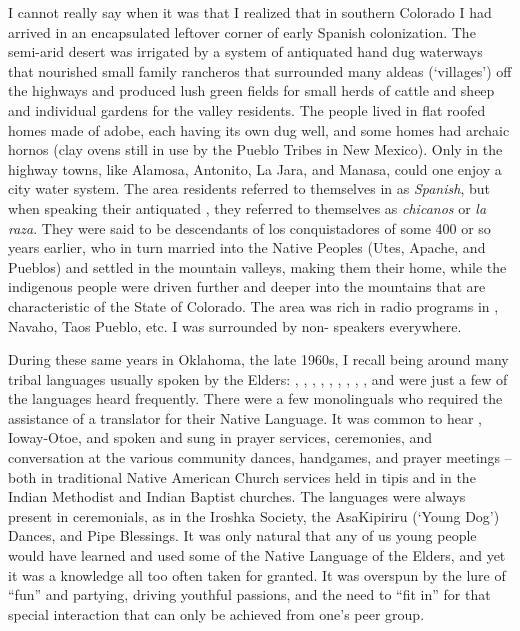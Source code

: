 \documentclass[output=paper]{LSP/langsci}
\begin{document}
I cannot really say when it was that I realized that in southern Colorado I had arrived in an encapsulated leftover corner of early Spanish colonization. The semi-arid desert was irrigated by a system of antiquated hand dug waterways that nourished small family rancheros that surrounded many aldeas (`villages') off the highways and produced lush green fields for small herds of cattle and sheep and individual gardens for the valley residents. The people lived in flat roofed homes made of adobe, each having its own dug well, and some homes had archaic hornos (clay ovens still in use by the Pueblo Tribes in New Mexico). Only in the highway towns, like Alamosa, Antonito, La Jara, and Manasa, could one enjoy a city water system. The area residents referred to themselves in  as \emph{Spanish}, but when speaking their antiquated , they referred to themselves as \emph{chicanos} or \emph{la raza}. They were said to be descendants of los conquistadores of some 400 or so years earlier, who in turn married into the Native Peoples (Utes, Apache, and Pueblos) and settled in the mountain valleys, making them their home, while the indigenous people were driven further and deeper into the mountains that are characteristic of the State of Colorado. The area was rich in radio programs in , Navaho, Taos Pueblo, etc. I was surrounded by non- speakers everywhere.

During these same years in Oklahoma, the late 1960s, I recall being around many tribal languages usually spoken by the Elders: , , , , , , , , , and  were just a few of the languages heard frequently. There were a few monolinguals who required the assistance of a translator for their Native Language. It was common to hear , Ioway-Otoe, and  spoken and sung in prayer services, ceremonies, and conversation at the various community dances, handgames, and prayer meetings -- both in traditional Native American Church services held in tipis and in the Indian Methodist and Indian Baptist churches. The languages were always present in ceremonials, as in the Iroshka Society, the AsaKipiriru (`Young Dog') Dances, and Pipe Blessings. It was only natural that any of us young people would have learned and used some of the Native Language of the Elders, and yet it was a knowledge all too often taken for granted. It was overspun by the lure of ``fun'' and partying, driving youthful passions, and the need to ``fit in'' for that special interaction that can only be achieved from one's peer group.
\end{document}
